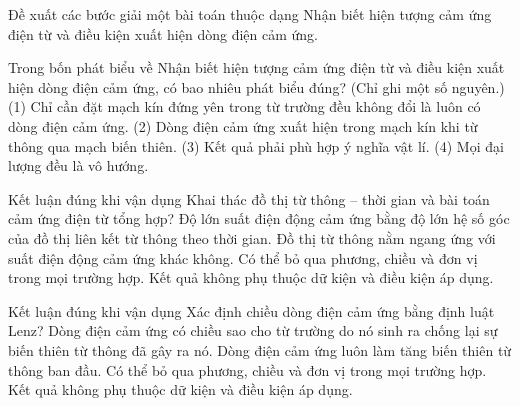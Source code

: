 \begin{bt}
Đề xuất các bước giải một bài toán thuộc dạng Nhận biết hiện tượng cảm ứng điện từ và điều kiện xuất hiện dòng điện cảm ứng.
\end{bt}

\begin{ex}
Trong bốn phát biểu về Nhận biết hiện tượng cảm ứng điện từ và điều kiện xuất hiện dòng điện cảm ứng, có bao nhiêu phát biểu đúng? (Chỉ ghi một số nguyên.) (1) Chỉ cần đặt mạch kín đứng yên trong từ trường đều không đổi là luôn có dòng điện cảm ứng. (2) Dòng điện cảm ứng xuất hiện trong mạch kín khi từ thông qua mạch biến thiên. (3) Kết quả phải phù hợp ý nghĩa vật lí. (4) Mọi đại lượng đều là vô hướng.
\end{ex}

\begin{ex}
Kết luận đúng khi vận dụng Khai thác đồ thị từ thông – thời gian và bài toán cảm ứng điện từ tổng hợp?
\choice
{\True Độ lớn suất điện động cảm ứng bằng độ lớn hệ số góc của đồ thị liên kết từ thông theo thời gian.}
{Đồ thị từ thông nằm ngang ứng với suất điện động cảm ứng khác không.}
{Có thể bỏ qua phương, chiều và đơn vị trong mọi trường hợp.}
{Kết quả không phụ thuộc dữ kiện và điều kiện áp dụng.}
\end{ex}

\begin{ex}
Kết luận đúng khi vận dụng Xác định chiều dòng điện cảm ứng bằng định luật Lenz?
\choice
{\True Dòng điện cảm ứng có chiều sao cho từ trường do nó sinh ra chống lại sự biến thiên từ thông đã gây ra nó.}
{Dòng điện cảm ứng luôn làm tăng biến thiên từ thông ban đầu.}
{Có thể bỏ qua phương, chiều và đơn vị trong mọi trường hợp.}
{Kết quả không phụ thuộc dữ kiện và điều kiện áp dụng.}
\end{ex}

